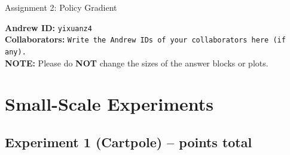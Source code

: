 \documentclass{article}
\begin{document}

\begin{centering}
    {\Large Assignment 2: Policy Gradient} \\
    \vspace{.25cm}
\end{centering}
\vspace{0.25cm}

\textbf{Andrew ID:} \texttt{yixuanz4} \\
\textbf{Collaborators:} \texttt{Write the Andrew IDs of your collaborators here (if any).}\\ 
\textbf{NOTE:} Please do \textbf{NOT} change the sizes of the answer blocks or plots.

\setcounter{section}{4}
\section{Small-Scale Experiments}

\subsection{Experiment 1 (Cartpole) --  points total\rbrack}
\end{document}
